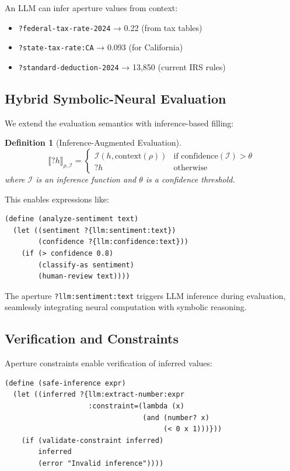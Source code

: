 \documentclass[12pt]{article}
\newtheorem{definition}[theorem]{Definition}
\begin{document}
An LLM can infer aperture values from context:
\begin{itemize}
    \item \texttt{?federal-tax-rate-2024} → 0.22 (from tax tables)
    \item \texttt{?state-tax-rate:CA} → 0.093 (for California)
    \item \texttt{?standard-deduction-2024} → 13,850 (current IRS rules)
\end{itemize}

\subsection{Hybrid Symbolic-Neural Evaluation}

We extend the evaluation semantics with inference-based filling:

\begin{definition}[Inference-Augmented Evaluation]
$$\llbracket ?h \rrbracket_{\rho, \mathcal{I}} = \begin{cases}
    \mathcal{I}(h, \text{context}(\rho)) & \text{if confidence}(\mathcal{I}) > \theta \\
    ?h & \text{otherwise}
\end{cases}$$
where $\mathcal{I}$ is an inference function and $\theta$ is a confidence threshold.
\end{definition}

This enables expressions like:

\begin{lstlisting}
(define (analyze-sentiment text)
  (let ((sentiment ?{llm:sentiment:text})
        (confidence ?{llm:confidence:text}))
    (if (> confidence 0.8)
        (classify-as sentiment)
        (human-review text))))
\end{lstlisting}

The aperture \texttt{?llm:sentiment:text} triggers LLM inference during evaluation, seamlessly integrating neural computation with symbolic reasoning.

\subsection{Verification and Constraints}

Aperture constraints enable verification of inferred values:

\begin{lstlisting}
(define (safe-inference expr)
  (let ((inferred ?{llm:extract-number:expr
                    :constraint=(lambda (x) 
                                 (and (number? x)
                                      (< 0 x 1)))}))
    (if (validate-constraint inferred)
        inferred
        (error "Invalid inference"))))
\end{lstlisting}
\end{document}
